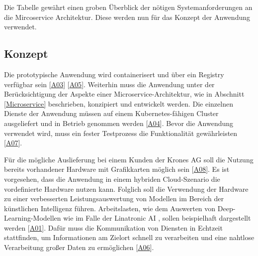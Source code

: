 Die Tabelle gewährt einen groben Überblick der nötigen Systemanforderungen an die Mircoservice Architektur. 
Diese werden nun für das Konzept der Anwendung verwendet.









\subsection{Konzept}\label{Konzept}
Die prototypische Anwendung wird containerisert und über ein Registry verfügbar sein [\hyperlink{A03}{A03}] [\hyperlink{A05}{A05}]. 
Weiterhin muss die Anwendung unter der Berücksichtigung der Aspekte einer Microservice-Architektur, wie in Abschnitt \ref{Microservice} beschrieben, konzipiert und entwickelt werden. 
Die einzelnen Dienste der Anwendung müssen auf einem Kubernetes-fähigen Cluster ausgeliefert und in Betrieb genommen werden [\hyperlink{A04}{A04}].
Bevor die Anwendung verwendet wird, muss ein fester Testprozess die Funktionalität gewährleisten [\hyperlink{A07}{A07}].

Für die mögliche Auslieferung bei einem Kunden der Krones AG soll die Nutzung bereits vorhandener Hardware mit Grafikkarten möglich sein [\hyperlink{A08}{A08}]. 
Es ist vorgesehen, dass die Anwendung in einem hybriden Cloud-Szenario die vordefinierte Hardware nutzen kann. Folglich soll die Verwendung der Hardware zu einer verbesserten Leistungsauswertung von Modellen im Bereich der künstlichen Intelligenz führen. 
Arbeitslasten, wie dem Auswerten von Deep-Learning-Modellen wie im Falle der Linatronic AI \cite{linatronic}, sollen beispielhaft dargestellt werden [\hyperlink{A01}{A01}]. 
Dafür muss die Kommunikation von Diensten in Echtzeit stattfinden, um Informationen am Zielort schnell zu verarbeiten und eine nahtlose Verarbeitung großer Daten zu ermöglichen [\hyperlink{A06}{A06}].

